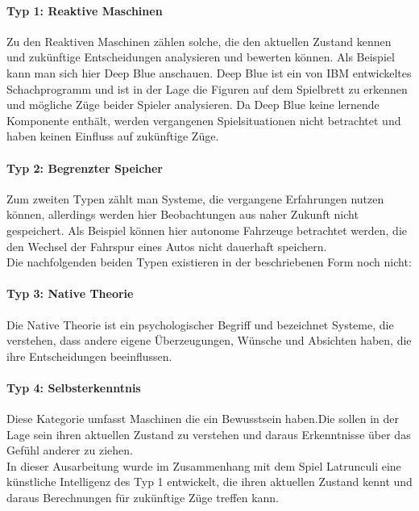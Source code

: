 \paragraph{Typ 1: Reaktive Maschinen}
Zu den Reaktiven Maschinen zählen solche, die den aktuellen Zustand kennen und zukünftige Entscheidungen analysieren und bewerten können. Als Beispiel kann man sich hier Deep Blue anschauen. Deep Blue ist ein von IBM entwickeltes Schachprogramm und ist in der Lage die Figuren auf dem Spielbrett zu erkennen  und mögliche Züge beider Spieler analysieren. Da Deep Blue keine lernende Komponente enthält, werden vergangenen Spielsituationen nicht betrachtet und haben keinen Einfluss auf zukünftige Züge.

\paragraph{Typ 2: Begrenzter Speicher}
Zum zweiten Typen zählt man Systeme, die vergangene Erfahrungen nutzen können, allerdings werden hier Beobachtungen aus naher Zukunft nicht gespeichert. Als Beispiel können hier autonome Fahrzeuge betrachtet werden, die den Wechsel der Fahrspur eines Autos nicht dauerhaft speichern.\\
\newline
Die nachfolgenden beiden Typen existieren in der beschriebenen Form noch nicht:
\paragraph{Typ 3: Native Theorie}
Die Native Theorie ist ein psychologischer Begriff und bezeichnet Systeme, die verstehen, dass andere eigene Überzeugungen, Wünsche und Absichten haben, die ihre Entscheidungen beeinflussen.
\paragraph{Typ 4: Selbsterkenntnis}
Diese Kategorie umfasst Maschinen die ein Bewusstsein haben.Die sollen in der Lage sein ihren aktuellen Zustand zu verstehen und daraus Erkenntnisse über das Gefühl anderer zu ziehen.\\
\newline
In dieser Ausarbeitung wurde im Zusammenhang mit dem Spiel Latrunculi eine künstliche Intelligenz des Typ 1 entwickelt, die ihren aktuellen Zustand kennt und daraus Berechnungen für zukünftige Züge treffen kann.
